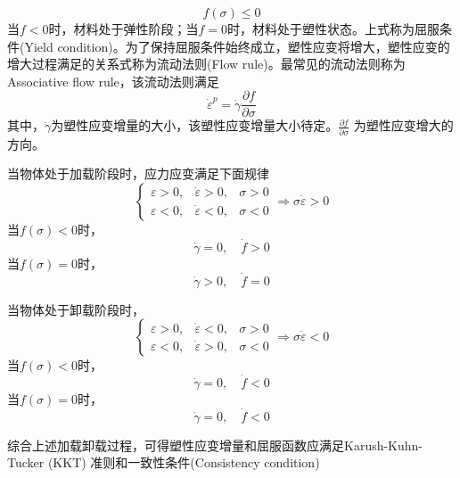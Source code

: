\begin{equation}
f(\sigma) \le 0
\end{equation}
当$f<0$时，材料处于弹性阶段；当$f=0$时，材料处于塑性状态。上式称为屈服条件(Yield condition)。为了保持屈服条件始终成立，塑性应变将增大，塑性应变的增大过程满足的关系式称为流动法则(Flow rule)。最常见的流动法则称为Associative flow rule，该流动法则满足
\begin{equation}
\dot \varepsilon^p = \dot \gamma \frac{\partial f}{\partial \sigma}
\end{equation}
其中，$\dot \gamma$为塑性应变增量的大小，该塑性应变增量大小待定。$\frac{\partial f}{\partial \sigma}$ 为塑性应变增大的方向。\par
当物体处于加载阶段时，应力应变满足下面规律
\begin{equation}
    \left \{
        \begin{array}{lll}
            \varepsilon > 0, & \dot \varepsilon > 0, & \sigma > 0 \\ 
            \varepsilon < 0, & \dot \varepsilon < 0, & \sigma < 0 
        \end{array}
    \right .
    \Rightarrow
    \sigma \dot \varepsilon > 0
\end{equation}
当$f(\sigma)<0$时，
\begin{equation}
\dot \gamma = 0, \quad \dot f > 0
\end{equation}
当$f(\sigma)=0$时，
\begin{equation}
\dot \gamma > 0, \quad \dot f = 0
\end{equation} \par
当物体处于卸载阶段时，
\begin{equation}
    \left \{
        \begin{array}{lll}
            \varepsilon > 0, & \dot \varepsilon < 0, & \sigma > 0 \\ 
            \varepsilon < 0, & \dot \varepsilon > 0, & \sigma < 0 
        \end{array}
    \right .
    \Rightarrow
    \sigma \dot \varepsilon < 0
\end{equation}
当$f(\sigma)<0$时，
\begin{equation}
\dot \gamma = 0, \quad \dot f < 0
\end{equation}
当$f(\sigma)=0$时，
\begin{equation}
\dot \gamma = 0, \quad \dot f < 0
\end{equation} \par
综合上述加载卸载过程，可得塑性应变增量和屈服函数应满足Karush-Kuhn-Tucker (KKT) 准则和一致性条件(Consistency condition)
